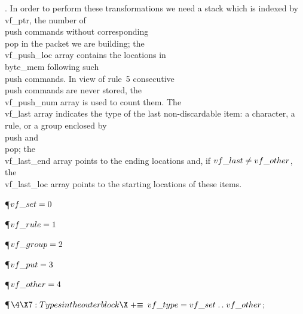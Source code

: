 \fi

. In order to perform these transformations we need a stack which is
indexed by \\{vf\_ptr}, the number of \\{push} commands without corresponding
\\{pop} in the packet we are building; the \\{vf\_push\_loc} array contains
the locations in \\{byte\_mem} following such \\{push} commands.
In view of rule~5 consecutive \\{push} commands are never stored, the
\\{vf\_push\_num} array is used to count them.
The \\{vf\_last} array indicates the type of the last non-discardable item:
a character, a rule, or a group enclosed by \\{push} and \\{pop};
the \\{vf\_last\_end} array points to the ending locations and, if
$\\{vf\_last}\I\\{vf\_other}$, the \\{vf\_last\_loc} array points to the
starting
locations of these items.

\Y\P\D {}$\\{vf\_set}=0$\par
\P\D {}$\\{vf\_rule}=1$\par
\P\D {}$\\{vf\_group}=2$\par
\P\D {}$\\{vf\_put}=3$\par
\P\D {}$\\{vf\_other}=4$\par
\Y\P$\4\X7:Types in the outer block\X\mathrel{+}\S$\6
$\\{vf\_type}=\\{vf\_set}\to\\{vf\_other}$;\par
\fi

